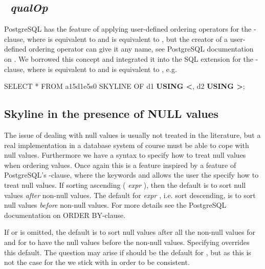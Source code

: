 \subsection{~\emph{qualOp}}
\label{sec:using-qualop}
PostgreSQL has the feature of applying user-defined ordering operators for
the -clause, where  is equivalent to
 and  is equivalent to , 
but the creator of a user-defined ordering operator can give it
any name, see PostgreSQL documentation on
.  We
borrowed this concept and integrated it into the SQL extension for the
-clause, where  is equivalent to
 and  is equivalent to
, e.g.

\begin{sql}
SELECT * FROM a15d1e5s0 SKYLINE OF d1 \textbf{USING <}, d2 \textbf{USING >};
\end{sql}


\subsection{Skyline in the presence of NULL values}
\label{sec:nullvalues}
The issue of dealing with null values is usually not treated in the
literature, but a real implementation in a database system of course
must be able to cope with null values.  Furthermore we have a syntax
to specify how to treat null values when ordering values.  Once again this is a feature
inspired by a feature of PostgreSQL's -clause, where
the keywords  and  allows
the user the specify how to treat null values.  
If sorting ascending ( \emph{expr}
), then the default is to sort null values \emph{after}
non-null values.
%
The default for  \emph{expr} , i.e. sort
descending, is to sort null values \emph{before} non-null values.
%
For more details see the PostgreSQL documentation on ORDER BY-clause.

If  or  is omitted, the
default is to sort null values after all the non-null values for
 and for  to have
the null values before the non-null values.  Specifying
 overrides this default.  
The question
may arise if  should be the default for
, but as this is not the case for the
 we stick with  in order to
be consistent.


